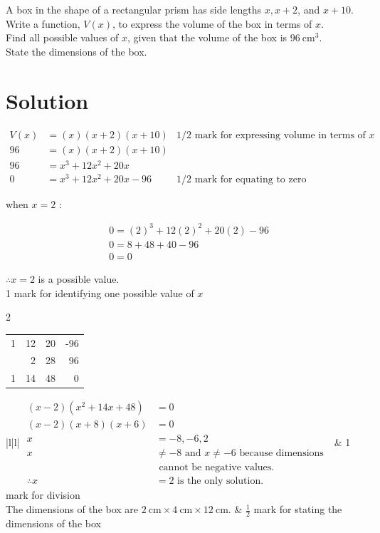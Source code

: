 \documentclass[10pt]{article}
\begin{document}
A box in the shape of a rectangular prism has side lengths $x, x+2$, and $x+10$.\\
Write a function, $V(x)$, to express the volume of the box in terms of $x$.\\
Find all possible values of $x$, given that the volume of the box is $96 \mathrm{~cm}^{3}$.\\
State the dimensions of the box.

\section*{Solution}
$$
\begin{array}{rlrl}
V(x) & =(x)(x+2)(x+10) & 1 / 2 \text { mark for expressing volume in terms of } x \\
96 & =(x)(x+2)(x+10) & \\
96 & =x^{3}+12 x^{2}+20 x & \\
0 & =x^{3}+12 x^{2}+20 x-96 & 1 / 2 \text { mark for equating to zero }
\end{array}
$$

when $x=2$ :

$$
\begin{aligned}
& 0=(2)^{3}+12(2)^{2}+20(2)-96 \\
& 0=8+48+40-96 \\
& 0=0
\end{aligned}
$$

$\therefore x=2$ is a possible value.\\
1 mark for identifying one possible value of $x$

2 \begin{tabular}{rrrr}
1 & 12 & 20 & -96 \\
 & 2 & 28 & 96 \\
\hline
1 & 14 & 48 & 0 \\
\hline
\end{tabular}

\begin{center}
\begin{tabular}{|l|l|}
\hline
\( \begin{aligned} (x-2)\left(x^{2}+14 x+48\right) & =0 \\ (x-2)(x+8)(x+6) & =0 \\ x & =-8,-6,2 \\ x & \neq-8 \text { and } x \neq-6 \text { because dimensions } \\ & \text { cannot be negative values. } \\ \therefore x & =2 \text { is the only solution. } \end{aligned} \) & 1 mark for division \\
\hline
The dimensions of the box are $2 \mathrm{~cm} \times 4 \mathrm{~cm} \times 12 \mathrm{~cm}$. & $\frac{1}{2}$ mark for stating the dimensions of the box \\
\hline
\end{tabular}
\end{center}
\end{document}
